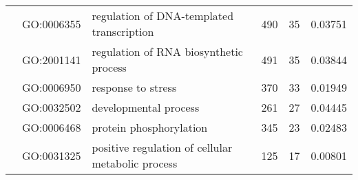 \documentclass[../main.tex]{subfiles}
\begin{document}
\begin{landscape}
\begin{longtable}{@{}lllccr@{}}
		                                               & GO:0006355                         & regulation of DNA-templated transcription                                 & 490                                                                & 35                                                                   & 0.03751                                                                                  \\
		                                               & GO:2001141                         & regulation of RNA biosynthetic process                                    & 491                                                                & 35                                                                   & 0.03844                                                                                  \\
		                                               & GO:0006950                         & response to stress                                                        & 370                                                                & 33                                                                   & 0.01949                                                                                  \\
		                                               & GO:0032502                         & developmental process                                                     & 261                                                                & 27                                                                   & 0.04445                                                                                  \\
		                                               & GO:0006468                         & protein phosphorylation                                                   & 345                                                                & 23                                                                   & 0.02483                                                                                  \\
		                                               & GO:0031325                         & positive regulation of cellular metabolic process                         & 125                                                                & 17                                                                   & 0.00801                                                                                  \\

\end{longtable}
\end{landscape}
\end{document}

